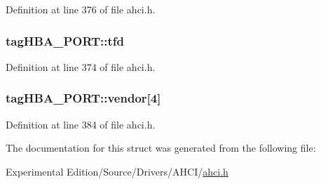 Definition at line 376 of file ahci.\+h.

\subsubsection[{\texorpdfstring{tfd}{tfd}}]{ tag\+H\+B\+A\+\_\+\+P\+O\+R\+T\+::tfd}\hypertarget{structtagHBA__PORT_aa37d7e6ddbbcf7bf9122a6749f90bda9}{}\label{structtagHBA__PORT_aa37d7e6ddbbcf7bf9122a6749f90bda9}


Definition at line 374 of file ahci.\+h.

\subsubsection[{\texorpdfstring{vendor}{vendor}}]{ tag\+H\+B\+A\+\_\+\+P\+O\+R\+T\+::vendor\mbox{[}4\mbox{]}}\hypertarget{structtagHBA__PORT_a8d00362b7a8c6f595c99f6eb87bededf}{}\label{structtagHBA__PORT_a8d00362b7a8c6f595c99f6eb87bededf}


Definition at line 384 of file ahci.\+h.



The documentation for this struct was generated from the following file\+:\begin{DoxyCompactItemize}
\item 
Experimental Edition/\+Source/\+Drivers/\+A\+H\+C\+I/\hyperlink{ahci_8h}{ahci.\+h}\end{DoxyCompactItemize}
